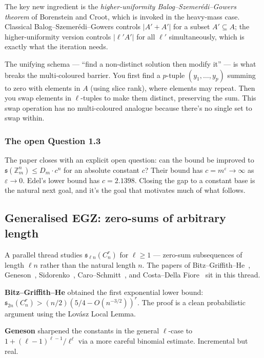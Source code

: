\documentclass[11pt,a4paper]{article}
\theoremstyle{plain}
\theoremstyle{definition}
\theoremstyle{remark}
\newcommand{\Z}{\mathbb{Z}}
\newcommand{\sUFp}{\mathfrak{s}}
\begin{document}
The key new ingredient is the \emph{higher-uniformity Balog--Szemer\'edi--Gowers theorem} of Borenstein and Croot, which is invoked in the heavy-mass case. Classical Balog--Szemer\'edi--Gowers controls $|A' + A'|$ for a subset $A' \subseteq A$; the higher-uniformity version controls $|\ell' A'|$ for all $\ell'$ simultaneously, which is exactly what the iteration needs.

The unifying schema --- ``find a non-distinct solution then modify it'' --- is what breaks the multi-coloured barrier. You first find a $p$-tuple $(y_1, \ldots, y_p)$ summing to zero with elements in $A$ (using slice rank), where elements may repeat. Then you swap elements in $\ell$-tuples to make them distinct, preserving the sum. This swap operation has no multi-coloured analogue because there's no single set to swap within.

\subsubsection{The open Question 1.3}

The paper closes with an explicit open question: can the bound be improved to $\sUFp(\Z_m^n) \leq D_m \cdot c^n$ for an absolute constant $c$? Their bound has $c = m^\varepsilon \to \infty$ as $\varepsilon \to 0$. Edel's lower bound has $c = 2.1398$. Closing the gap to a constant base is the natural next goal, and it's the goal that motivates much of what follows.

\subsection{Generalised EGZ: zero-sums of arbitrary length}

A parallel thread studies $\sUFp_{\ell n}(C_n^r)$ for $\ell \geq 1$ --- zero-sum subsequences of length $\ell n$ rather than the natural length $n$. The papers of Bitz--Griffith--He~\cite{bitzgriffithhe2017}, Geneson~\cite{geneson2020}, Sidorenko~\cite{sidorenko2020}, Caro--Schmitt~\cite{caroschmitt2022}, and Costa--Della Fiore~\cite{costadellafiore2022} sit in this thread.

\textbf{Bitz--Griffith--He} obtained the first exponential lower bound: $\sUFp_{2n}(C_n^r) > (n/2)(5/4 - O(n^{-3/2}))^r$. The proof is a clean probabilistic argument using the Lov\'asz Local Lemma.

\textbf{Geneson} sharpened the constants in the general $\ell$-case to $1 + (\ell-1)^{\ell-1}/\ell^\ell$ via a more careful binomial estimate. Incremental but real.
\end{document}
